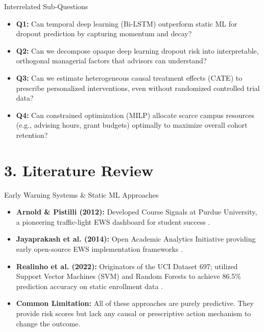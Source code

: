 \documentclass[aspectratio=169, 10pt]{beamer}
\begin{document}
\begin{frame}{Interrelated Sub-Questions}
  \begin{itemize}
    \item \textbf{Q1:} Can temporal deep learning (Bi-LSTM) outperform static ML for dropout prediction by capturing momentum and decay?
    \vspace{0.3cm}
    \item \textbf{Q2:} Can we decompose opaque deep learning dropout risk into interpretable, orthogonal managerial factors that advisors can understand?
    \vspace{0.3cm}
    \item \textbf{Q3:} Can we estimate heterogeneous causal treatment effects (CATE) to prescribe personalized interventions, even without randomized controlled trial data?
    \vspace{0.3cm}
    \item \textbf{Q4:} Can constrained optimization (MILP) allocate scarce campus resources (e.g., advising hours, grant budgets) optimally to maximize overall cohort retention?
  \end{itemize}
\end{frame}

\section{3. Literature Review}

\begin{frame}{Early Warning Systems \& Static ML Approaches}
  \begin{itemize}
    \item \textbf{Arnold \& Pistilli (2012):} Developed Course Signals at Purdue University, a pioneering traffic-light EWS dashboard for student success \cite{arnold2012course}.
    \vspace{0.2cm}
    \item \textbf{Jayaprakash et al. (2014):} Open Academic Analytics Initiative providing early open-source EWS implementation frameworks \cite{jayaprakash2014early}.
    \vspace{0.2cm}
    \item \textbf{Realinho et al. (2022):} Originators of the UCI Dataset 697; utilized Support Vector Machines (SVM) and Random Forests to achieve 86.5\% prediction accuracy on static enrollment data \cite{realinho2022predicting}.
    \vspace{0.2cm}
    \item \textbf{Common Limitation:} All of these approaches are purely predictive. They provide risk scores but lack any causal or prescriptive action mechanism to change the outcome.
  \end{itemize}
\end{frame}
\end{document}
